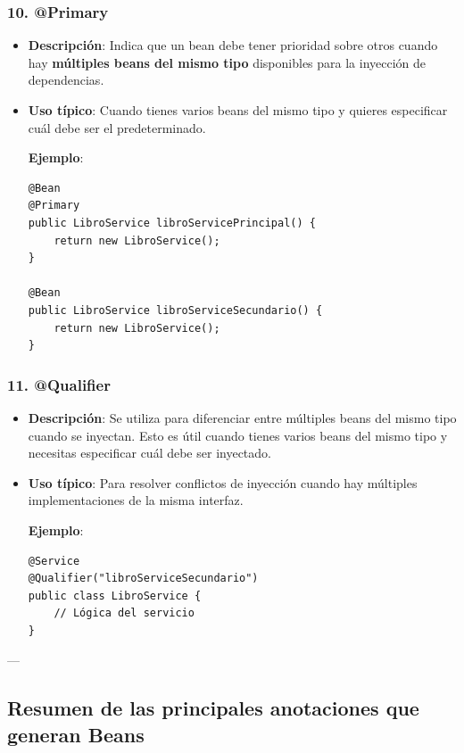 \documentclass[11pt]{article}
\begin{document}
\subsubsection{10. \textbf{\textbf{@Primary}}}
\label{sec:org86c1fc8}
\begin{itemize}
\item \textbf{\textbf{Descripción}}: Indica que un bean debe tener prioridad sobre otros cuando hay \textbf{\textbf{múltiples beans del mismo tipo}} disponibles para la inyección de dependencias.
\item \textbf{\textbf{Uso típico}}: Cuando tienes varios beans del mismo tipo y quieres especificar cuál debe ser el predeterminado.

\textbf{\textbf{Ejemplo}}:
\begin{verbatim}
@Bean
@Primary
public LibroService libroServicePrincipal() {
    return new LibroService();
}

@Bean
public LibroService libroServiceSecundario() {
    return new LibroService();
}
\end{verbatim}
\end{itemize}

\subsubsection{11. \textbf{\textbf{@Qualifier}}}
\label{sec:org18b11db}
\begin{itemize}
\item \textbf{\textbf{Descripción}}: Se utiliza para diferenciar entre múltiples beans del mismo tipo cuando se inyectan. Esto es útil cuando tienes varios beans del mismo tipo y necesitas especificar cuál debe ser inyectado.
\item \textbf{\textbf{Uso típico}}: Para resolver conflictos de inyección cuando hay múltiples implementaciones de la misma interfaz.

\textbf{\textbf{Ejemplo}}:
\begin{verbatim}
@Service
@Qualifier("libroServiceSecundario")
public class LibroService {
    // Lógica del servicio
}
\end{verbatim}
\end{itemize}

---

\subsection{Resumen de las principales anotaciones que generan Beans}
\label{sec:orgd04cc74}
\end{document}
